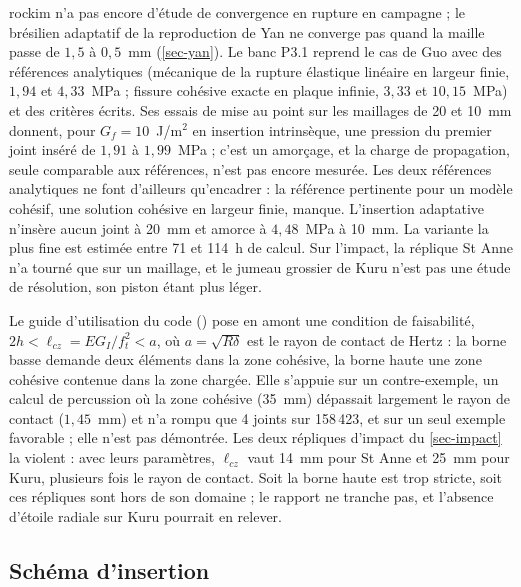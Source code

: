 rockim n'a pas encore d'étude de convergence en rupture en campagne ; le brésilien adaptatif de la reproduction de Yan ne converge pas quand la maille passe de $1{,}5$ à $0{,}5$~mm (\cref{sec-yan}). Le banc P3.1 reprend le cas de Guo avec des références analytiques (mécanique de la rupture élastique linéaire en largeur finie, $1{,}94$ et $4{,}33$~MPa ; fissure cohésive exacte en plaque infinie, $3{,}33$ et $10{,}15$~MPa) et des critères écrits. Ses essais de mise au point sur les maillages de 20 et 10~mm donnent, pour $G_f = 10$~J/m$^2$ en insertion intrinsèque, une pression du premier joint inséré de $1{,}91$ à $1{,}99$~MPa ; c'est un amorçage, et la charge de propagation, seule comparable aux références, n'est pas encore mesurée. Les deux références analytiques ne font d'ailleurs qu'encadrer : la référence pertinente pour un modèle cohésif, une solution cohésive en largeur finie, manque. L'insertion adaptative n'insère aucun joint à 20~mm et amorce à $4{,}48$~MPa à 10~mm. La variante la plus fine est estimée entre 71 et 114~h de calcul. Sur l'impact, la réplique St Anne n'a tourné que sur un maillage, et le jumeau grossier de Kuru n'est pas une étude de résolution, son piston étant plus léger.

Le guide d'utilisation du code () pose en amont une condition de faisabilité, $2h < \ell_{cz} = E G_I/f_t^2 < a$, où $a = \sqrt{R\delta}$ est le rayon de contact de Hertz : la borne basse demande deux éléments dans la zone cohésive, la borne haute une zone cohésive contenue dans la zone chargée. Elle s'appuie sur un contre-exemple, un calcul de percussion où la zone cohésive (35~mm) dépassait largement le rayon de contact ($1{,}45$~mm) et n'a rompu que 4 joints sur 158\,423, et sur un seul exemple favorable ; elle n'est pas démontrée. Les deux répliques d'impact du \cref{sec-impact} la violent : avec leurs paramètres, $\ell_{cz}$ vaut 14~mm pour St Anne et 25~mm pour Kuru, plusieurs fois le rayon de contact. Soit la borne haute est trop stricte, soit ces répliques sont hors de son domaine ; le rapport ne tranche pas, et l'absence d'étoile radiale sur Kuru pourrait en relever.

\subsection{Schéma d'insertion}
\label{sec-insertion}

